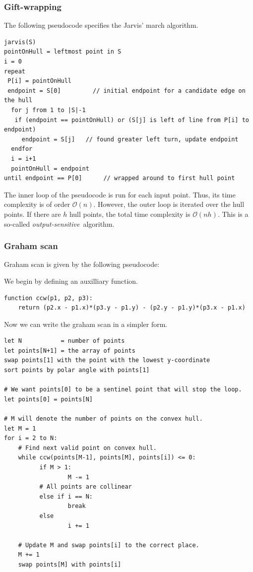\documentclass[a4paper,12pt,leqno,titlepage]{article}
\newcommand{\bigO}{\mathcal{O}}
\begin{document}
\subsubsection{Gift-wrapping}
The following pseudocode specifies the Jarvis' march algorithm\cite{GW}.

\begin{verbatim}
jarvis(S)
pointOnHull = leftmost point in S
i = 0
repeat
 P[i] = pointOnHull
 endpoint = S[0]         // initial endpoint for a candidate edge on the hull
  for j from 1 to |S|-1
   if (endpoint == pointOnHull) or (S[j] is left of line from P[i] to endpoint)
     endpoint = S[j]   // found greater left turn, update endpoint
  endfor
  i = i+1
  pointOnHull = endpoint
until endpoint == P[0]      // wrapped around to first hull point
\end{verbatim}

The inner loop of the pseudocode is run for each input point.
Thus, its time complexity is of order $\bigO(n)$. 
However, the outer loop is iterated over the hull points.
If there are $h$ hull points, the total time complexity is $\bigO(nh)$.
This is a so-called \emph{output-sensitive} algorithm.


\subsubsection{Graham scan}
Graham scan is given by the following pseudocode\cite{GS}:

We begin by defining an auxilliary function. \begin{verbatim}
function ccw(p1, p2, p3):
    return (p2.x - p1.x)*(p3.y - p1.y) - (p2.y - p1.y)*(p3.x - p1.x)
\end{verbatim}

Now we can write the graham scan in a simpler form.

\begin{verbatim}
let N           = number of points
let points[N+1] = the array of points
swap points[1] with the point with the lowest y-coordinate
sort points by polar angle with points[1]

# We want points[0] to be a sentinel point that will stop the loop.
let points[0] = points[N]

# M will denote the number of points on the convex hull.
let M = 1
for i = 2 to N:
    # Find next valid point on convex hull.
    while ccw(points[M-1], points[M], points[i]) <= 0:
          if M > 1:
                  M -= 1
          # All points are collinear
          else if i == N:
                  break
          else
                  i += 1

    # Update M and swap points[i] to the correct place.
    M += 1
    swap points[M] with points[i]

\end{verbatim}
\end{document}
